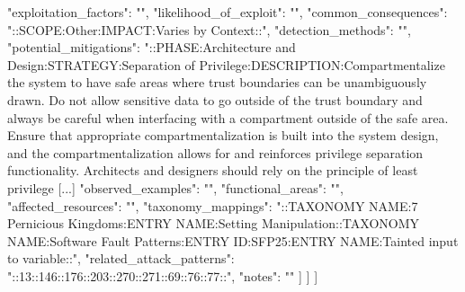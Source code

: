 \begin{code}
{{{{{        "exploitation_factors": "",
        "likelihood_of_exploit": "",
        "common_consequences": "::SCOPE:Other:IMPACT:Varies by Context::",
        "detection_methods": "",
        "potential_mitigations": "::PHASE:Architecture and Design:STRATEGY:Separation of Privilege:DESCRIPTION:Compartmentalize the system to have safe areas where trust boundaries can be unambiguously drawn. Do not allow sensitive data to go outside of the trust boundary and always be careful when interfacing with a compartment outside of the safe area. Ensure that appropriate compartmentalization is built into the system design, and the compartmentalization allows for and reinforces privilege separation functionality. Architects and designers should rely on the principle of least privilege [...]
        "observed_examples": "",
        "functional_areas": "",
        "affected_resources": "",
        "taxonomy_mappings": "::TAXONOMY NAME:7 Pernicious Kingdoms:ENTRY NAME:Setting Manipulation::TAXONOMY NAME:Software Fault Patterns:ENTRY ID:SFP25:ENTRY NAME:Tainted input to variable::",
        "related_attack_patterns": "::13::146::176::203::270::271::69::76::77::",
        "notes": ""
       }
      }
     ]
    }
   ]
  }
 ]
}   
\end{code}
